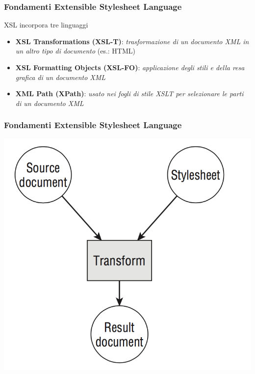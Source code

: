 \begin{frame}
    \frametitle{Fondamenti Extensible Stylesheet Language}
    \addtocounter{nframe}{1}
    

     \begin{block}{XSL incorpora tre linguaggi}
         \begin{itemize}
            \item \textbf{XSL Transformations (XSL-T)}: \textit{trasformazione di un documento XML in un altro tipo di documento} (es.: HTML)
            \item \textbf{XSL Formatting Objects (XSL-FO)}: \textit{applicazione degli stili e della resa grafica di un documento XML}
            \item \textbf{XML Path (XPath)}: \textit{usato nei fogli di stile XSLT per selezionare le parti di un documento XML}
        \end{itemize}
     \end{block}
    
\end{frame}

\begin{frame}
    \frametitle{Fondamenti Extensible Stylesheet Language}
    \addtocounter{nframe}{1}
    
    \begin{center}
        \includegraphics[width=.8\textwidth]{imgs/SchemaXSLTprocessing.png}
    \end{center}

\end{frame}


